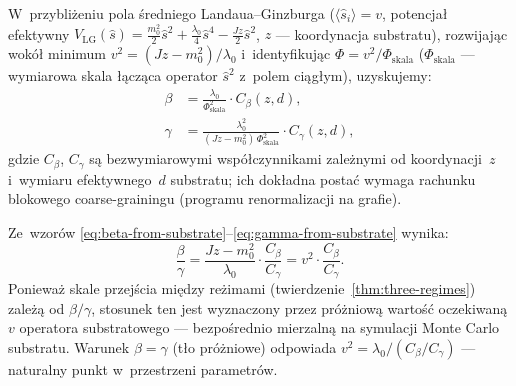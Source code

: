 \begin{proposition}\label{prop:eff-params}
W~przybli\.zeniu pola \'sredniego Landaua--Ginzburga
($\langle\hat{s}_i\rangle = v$, potencja\l{} efektywny
$V_{\mathrm{LG}}(\hat{s}) = \frac{m_0^2}{2}\hat{s}^2
+ \frac{\lambda_0}{4}\hat{s}^4 - \frac{Jz}{2}\hat{s}^2$,
$z$ --- koordynacja substratu), rozwijaj\k{a}c wok\'o\l{}
minimum $v^2 = (Jz - m_0^2)/\lambda_0$ i~identyfikuj\k{a}c
$\Phi = v^2/\Phi_{\mathrm{skala}}$ ($\Phi_{\mathrm{skala}}$
--- wymiarowa skala \l{}\k{a}cz\k{a}ca operator $\hat{s}^2$
z~polem ci\k{a}g\l{}ym), uzyskujemy:
\begin{align}
    \beta &= \frac{\lambda_0}{\Phi_{\mathrm{skala}}^2}
             \cdot C_\beta(z, d),
    \label{eq:beta-from-substrate} \\
    \gamma &= \frac{\lambda_0^2}{(Jz - m_0^2)\,\Phi_{\mathrm{skala}}^2}
             \cdot C_\gamma(z, d),
    \label{eq:gamma-from-substrate}
\end{align}
gdzie $C_\beta$, $C_\gamma$ s\k{a} bezwymiarowymi
wsp\'o\l{}czynnikami zale\.znymi od koordynacji~$z$
i~wymiaru efektywnego~$d$ substratu; ich dok\l{}adna
posta\'c wymaga rachunku blokowego coarse-grainingu
(programu renormalizacji na grafie).
\end{proposition}

\begin{remark}\label{rem:hier-bg}
Ze~wzor\'ow \eqref{eq:beta-from-substrate}--\eqref{eq:gamma-from-substrate}
wynika:
\begin{equation}
    \frac{\beta}{\gamma}
    = \frac{Jz - m_0^2}{\lambda_0}\cdot\frac{C_\beta}{C_\gamma}
    = v^2\cdot\frac{C_\beta}{C_\gamma}.
\end{equation}
Poniewa\.z skale przej\'scia mi\k{e}dzy re\.zimami
(twierdzenie~\ref{thm:three-regimes}) zale\.z\k{a}
od $\beta/\gamma$, stosunek ten jest wyznaczony
przez pr\'o\.zniow\k{a} warto\'s\'c oczekiwan\k{a} $v$
operatora substratowego --- bezpo\'srednio mierzaln\k{a}
na symulacji Monte Carlo substratu.
Warunek $\beta = \gamma$ (t\l{}o pr\'o\.zniowe) odpowiada
$v^2 = \lambda_0/(C_\beta/C_\gamma)$ --- naturalny punkt
w~przestrzeni parametr\'ow.
\end{remark}

